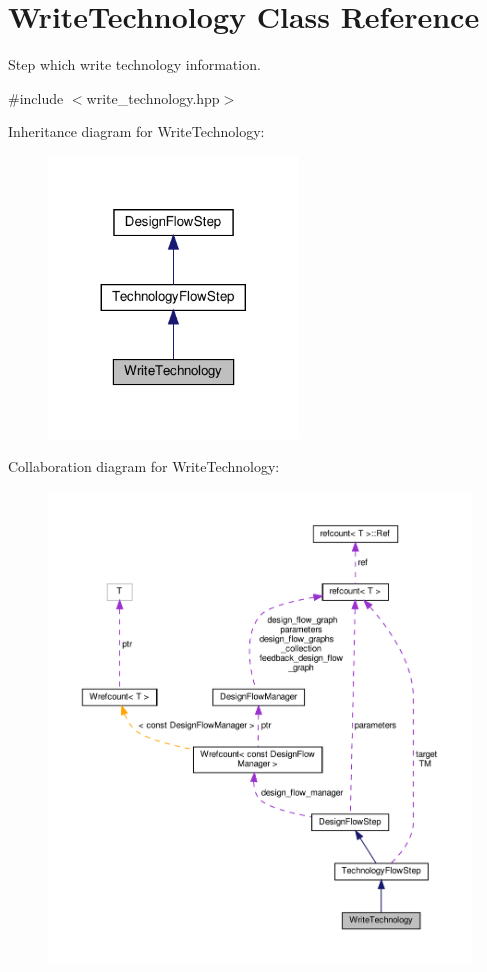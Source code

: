 \hypertarget{classWriteTechnology}{}\section{Write\+Technology Class Reference}
\label{classWriteTechnology}


Step which write technology information.  




{\ttfamily \#include $<$write\+\_\+technology.\+hpp$>$}



Inheritance diagram for Write\+Technology\+:
\nopagebreak
\begin{figure}[H]
\begin{center}
\leavevmode
\includegraphics[width=188pt]{de/d58/classWriteTechnology__inherit__graph}
\end{center}
\end{figure}


Collaboration diagram for Write\+Technology\+:
\nopagebreak
\begin{figure}[H]
\begin{center}
\leavevmode
\includegraphics[width=350pt]{dc/dd5/classWriteTechnology__coll__graph}
\end{center}
\end{figure}
